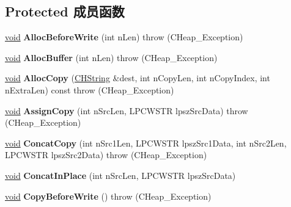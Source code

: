 \subsection*{Protected 成员函数}
\begin{DoxyCompactItemize}
\item 
\mbox{\label{class_c_h_string_ad75659ae371bde3c0e974201133b379a}} 
\hyperlink{interfacevoid}{void} {\bfseries Alloc\+Before\+Write} (int n\+Len)  throw (\+C\+Heap\+\_\+\+Exception)
\item 
\mbox{\label{class_c_h_string_ab96c1292e7d35987fb27c6bab09dc2d8}} 
\hyperlink{interfacevoid}{void} {\bfseries Alloc\+Buffer} (int n\+Len)  throw (\+C\+Heap\+\_\+\+Exception)
\item 
\mbox{\label{class_c_h_string_a9808d4690d80b7b3840cd59b031e28b4}} 
\hyperlink{interfacevoid}{void} {\bfseries Alloc\+Copy} (\hyperlink{class_c_h_string}{C\+H\+String} \&dest, int n\+Copy\+Len, int n\+Copy\+Index, int n\+Extra\+Len) const  throw (\+C\+Heap\+\_\+\+Exception)
\item 
\mbox{\label{class_c_h_string_a83077fa22a75c7da4f8ce8afdd88d263}} 
\hyperlink{interfacevoid}{void} {\bfseries Assign\+Copy} (int n\+Src\+Len, L\+P\+C\+W\+S\+TR lpsz\+Src\+Data)  throw (\+C\+Heap\+\_\+\+Exception)
\item 
\mbox{\label{class_c_h_string_ab255cd067a5051336f5d36efd7d40234}} 
\hyperlink{interfacevoid}{void} {\bfseries Concat\+Copy} (int n\+Src1\+Len, L\+P\+C\+W\+S\+TR lpsz\+Src1\+Data, int n\+Src2\+Len, L\+P\+C\+W\+S\+TR lpsz\+Src2\+Data)  throw (\+C\+Heap\+\_\+\+Exception)
\item 
\mbox{\label{class_c_h_string_ad9a387c32bfc5bcae40975ed66bec1f1}} 
\hyperlink{interfacevoid}{void} {\bfseries Concat\+In\+Place} (int n\+Src\+Len, L\+P\+C\+W\+S\+TR lpsz\+Src\+Data)
\item 
\mbox{\label{class_c_h_string_a26780ca60e91496c8f1ebf3ed5939579}} 
\hyperlink{interfacevoid}{void} {\bfseries Copy\+Before\+Write} ()  throw (\+C\+Heap\+\_\+\+Exception)
\item 
\mbox{\label{class_c_h_string_a0238f4fe3de58ee44588e00563eb8f0c}} 

\end{DoxyCompactItemize}
